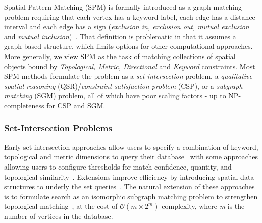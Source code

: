 \par{
    Spatial Pattern Matching (SPM) is formally introduced as a graph matching problem requiring that each vertex has a keyword label, each edge has a distance interval and each edge has a sign (\textit{exclusion in, exclusion out, mutual exclusion} and \textit{mutual inclusion})~\cite{Fang2019}.
    That definition is problematic in that it assumes a graph-based structure, which limits options for other computational approaches.
    More generally, we view SPM as the task of matching collections of spatial objects bound by \textit{Topological, Metric, Directional} and \textit{Keyword} constraints.
    Most SPM methods formulate the problem as a \textit{set-intersection} problem, a \textit{qualitative spatial reasoning} (QSR)/\textit{constraint satisfaction problem} (CSP), or a \textit{subgraph-matching} (SGM) problem, all of which have poor scaling factors - up to NP-completeness for CSP and SGM. 
    }
\subsubsection{Set-Intersection Problems}
\par{  
    Early set-intersection approaches allow users to specify a combination of keyword, topological and metric dimensions to query their database~\cite{DiLoreto1996} with some approaches allowing users to configure thresholds for match confidence, quantity, and topological similarity~\cite{Soffer1997, Soffer1998a}. 
    Extensions improve efficiency by introducing spatial data structures to underly the set queries~\cite{Soffer1999}.
    The natural extension of these approaches is to formulate search as an isomorphic subgraph matching problem to strengthen topological matching~\cite{Folkers2000}, at the cost of $\mathcal{O}(m\times 2^m)$ complexity, where \textit{m} is the number of vertices in the database. 
}
